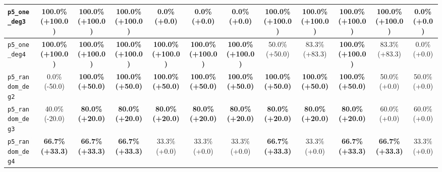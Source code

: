 \begin{landscape}
\begin{table}[H]
{\begin{tabular}{lccccccccccc}
\hline
\texttt{p5\_one\_deg3} & \textbf{100.0\% (+100.0)} & \textbf{100.0\% (+100.0)} & \textbf{100.0\% (+100.0)} & 0.0\% (+0.0) & 0.0\% (+0.0) & 0.0\% (+0.0) & \textbf{100.0\% (+100.0)} & \textbf{100.0\% (+100.0)} & \textbf{100.0\% (+100.0)} & \textbf{100.0\% (+100.0)} & 0.0\% (+0.0) \\
\hline
\texttt{p5\_one\_deg4} & \textbf{100.0\% (+100.0)} & \textbf{100.0\% (+100.0)} & \textbf{100.0\% (+100.0)} & \textbf{100.0\% (+100.0)} & \textbf{100.0\% (+100.0)} & \textbf{100.0\% (+100.0)} & 50.0\% (+50.0) & 83.3\% (+83.3) & \textbf{100.0\% (+100.0)} & 83.3\% (+83.3) & 0.0\% (+0.0) \\
\hline
\texttt{p5\_random\_deg2} & 0.0\% (-50.0) & \textbf{100.0\% (+50.0)} & \textbf{100.0\% (+50.0)} & \textbf{100.0\% (+50.0)} & \textbf{100.0\% (+50.0)} & \textbf{100.0\% (+50.0)} & \textbf{100.0\% (+50.0)} & \textbf{100.0\% (+50.0)} & \textbf{100.0\% (+50.0)} & 50.0\% (+0.0) & 50.0\% (+0.0) \\
\hline
\texttt{p5\_random\_deg3} & 40.0\% (-20.0) & \textbf{80.0\% (+20.0)} & \textbf{80.0\% (+20.0)} & \textbf{80.0\% (+20.0)} & \textbf{80.0\% (+20.0)} & \textbf{80.0\% (+20.0)} & \textbf{80.0\% (+20.0)} & \textbf{80.0\% (+20.0)} & \textbf{80.0\% (+20.0)} & 60.0\% (+0.0) & 60.0\% (+0.0) \\
\hline
\texttt{p5\_random\_deg4} & \textbf{66.7\% (+33.3)} & \textbf{66.7\% (+33.3)} & \textbf{66.7\% (+33.3)} & 33.3\% (+0.0) & 33.3\% (+0.0) & 33.3\% (+0.0) & \textbf{66.7\% (+33.3)} & 33.3\% (+0.0) & \textbf{66.7\% (+33.3)} & \textbf{66.7\% (+33.3)} & 33.3\% (+0.0) \\
\bottomrule
\end{tabular}
}%
\end{table}
\end{landscape}



